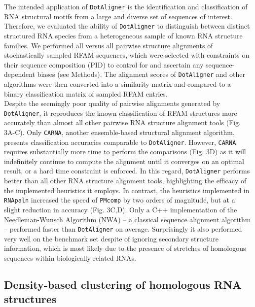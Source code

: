 \documentclass{bmcart}
\newcommand\dotaligner{\texttt{DotAligner}}
\newcommand\carna{\texttt{CARNA}}
\begin{document}
The intended application of \dotaligner{}  is the identification and
classification of RNA structural motifs from a large and diverse set of sequences of interest. 
Therefore, we evaluated the ability of \dotaligner{} to distinguish between distinct structured 
RNA species from a heterogeneous sample of known RNA structure families. 
We performed all versus all pairwise structure alignments of stochastically sampled RFAM sequences, 
which were selected with constraints on their sequence composition (PID) to 
control for and ascertain any sequence-dependent biases (see Methods). The alignment scores 
of \dotaligner{} and other algorithms were then converted into a similarity matrix and 
compared to a binary classification matrix of sampled RFAM entries. \\

Despite the seemingly poor quality of pairwise alignments generated by
\dotaligner{}, it reproduces the known classification of RFAM structures more
accurately than almost all other pairwise RNA structure alignment tools (Fig.
3A-C). Only \carna{}, another ensemble-based structural alignment algorithm,
presents classification accuracies comparable to \dotaligner{}. However,
\carna{} requires substantially more time to perform the comparisons (Fig. 3D)
as it will indefinitely continue to compute the alignment until it converges on
an optimal result, or a hard time constraint is enforced.  In this regard,
\dotaligner{} performs better than all other RNA structure alignment tools,
highlighting the efficacy of the implemented  heuristics it employs. In
contrast, the heuristics implemented in \texttt{RNApaln} increased the speed of
\texttt{PMcomp} by two orders of magnitude, but at a slight reduction in
accuracy (Fig. 3C,D). Only a C++ implementation of the Needleman-Wunsch
Algorithm (NWA) \cite{needleman1970general} -- a classical sequence alignment
algorithm -- performed faster than \dotaligner{} on average. Surprisingly it
also performed very well on the benchmark set despite of ignoring secondary
structure information, which is most likely due to the presence of stretches of
homologous sequences within biologically related RNAs.  \\

\subsection*{Density-based clustering of homologous RNA structures}
\end{document}
